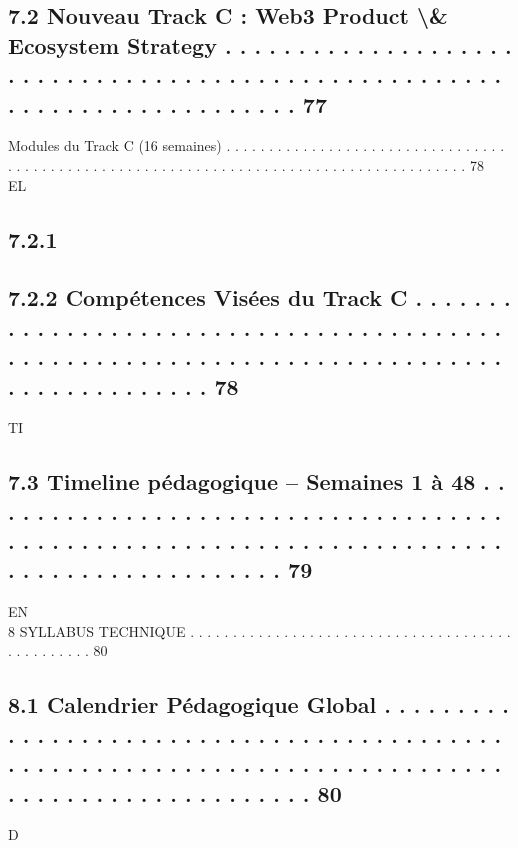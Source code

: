 \subsection{7.2     Nouveau Track C : Web3 Product \textbackslash{}& Ecosystem Strategy . . . . . . . . . . . . . . . . . . . . . . . . . . . . . . . . . . . . . . . . . . . . . . . . . . . . . . . . . . . . . . . . . . . . . . . . . . 77}
Modules du Track C (16 semaines) . . . . . . . . . . . . . . . . . . . . . . . . . . . . . . . . . . . . . . . . . . . . . . . . . . . . . . . . . . . . . . . . . . . . . . . . . . . . . . . . . . . . . . . 78\\
\vspace{0.5em}
\vspace{0.5em}
\vspace{0.5em}
\vspace{0.5em}
EL\\
\subsection{7.2.1}
\subsection{7.2.2              Compétences Visées du Track C . . . . . . . . . . . . . . . . . . . . . . . . . . . . . . . . . . . . . . . . . . . . . . . . . . . . . . . . . . . . . . . . . . . . . . . . . . . . . . . . . . . . . . . . . 78}
\vspace{0.5em}
\vspace{0.5em}
\vspace{0.5em}
\vspace{0.5em}
TI\\
\subsection{7.3     Timeline pédagogique – Semaines 1 à 48 . . . . . . . . . . . . . . . . . . . . . . . . . . . . . . . . . . . . . . . . . . . . . . . . . . . . . . . . . . . . . . . . . . . . . . . . . . . . . . . . . . . . . . . . . 79}
\vspace{0.5em}
\vspace{0.5em}
\vspace{0.5em}
\vspace{0.5em}
EN\\
8     SYLLABUS TECHNIQUE . . . . . . . . . . . . . . . . . . . . . . . . . . . . . . . . . . . . . . . . . . . . . . . . 80\\
\subsection{8.1     Calendrier Pédagogique Global . . . . . . . . . . . . . . . . . . . . . . . . . . . . . . . . . . . . . . . . . . . . . . . . . . . . . . . . . . . . . . . . . . . . . . . . . . . . . . . . . . . . . . . . . . . . . . . . . . 80}
\vspace{0.5em}
\vspace{0.5em}
\vspace{0.5em}
\vspace{0.5em}
D\\
